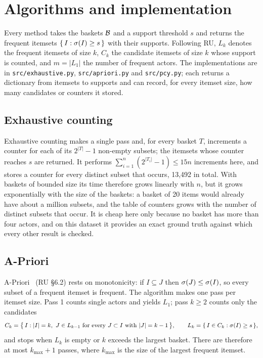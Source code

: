\section{Algorithms and implementation}
\label{sec:algorithms}

Every method takes the baskets $\mathcal{B}$ and a support threshold $s$ and returns the frequent itemsets $\{\, I : \sigma(I) \ge s \,\}$ with their supports. Following RU, $L_k$ denotes the frequent itemsets of size $k$, $C_k$ the candidate itemsets of size $k$ whose support is counted, and $m = |L_1|$ the number of frequent actors. The implementations are in \texttt{src/exhaustive.py}, \texttt{src/apriori.py} and \texttt{src/pcy.py}; each returns a dictionary from itemsets to supports and can record, for every itemset size, how many candidates or counters it stored.

\subsection{Exhaustive counting}

Exhaustive counting makes a single pass and, for every basket $T$, increments a counter for each of its $2^{|T|} - 1$ non-empty subsets; the itemsets whose counter reaches $s$ are returned. It performs $\sum_{i=1}^{n} (2^{|T_i|} - 1) \le 15n$ increments here, and stores a counter for every distinct subset that occurs, 13{,}492 in total. With baskets of bounded size its time therefore grows linearly with $n$, but it grows exponentially with the size of the baskets: a basket of 20 items would already have about a million subsets, and the table of counters grows with the number of distinct subsets that occur. It is cheap here only because no basket has more than four actors, and on this dataset it provides an exact ground truth against which every other result is checked.

\subsection{A-Priori}

A-Priori~\cite{agrawal1994} (RU \S6.2) rests on monotonicity: if $I \subseteq J$ then $\sigma(J) \le \sigma(I)$, so every subset of a frequent itemset is frequent. The algorithm makes one pass per itemset size. Pass 1 counts single actors and yields $L_1$; pass $k \ge 2$ counts only the candidates
\[
  C_k = \bigl\{\, I : |I| = k,\ J \in L_{k-1} \text{ for every } J \subset I \text{ with } |J| = k - 1 \,\bigr\},
  \qquad
  L_k = \{\, I \in C_k : \sigma(I) \ge s \,\},
\]
and stops when $L_k$ is empty or $k$ exceeds the largest basket. There are therefore at most $k_{\max} + 1$ passes, where $k_{\max}$ is the size of the largest frequent itemset.

